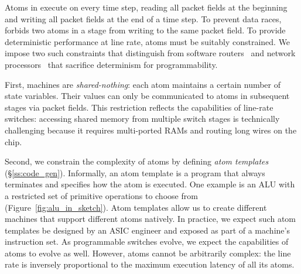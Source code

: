
Atoms in \absmachine execute on every time step, reading all packet fields at
the beginning and writing all packet fields at the end of a time step. To
prevent data races, \absmachine forbids two atoms in a stage from writing to
the same packet field.  To provide deterministic performance at line rate,
atoms must be suitably constrained.  We impose two such constraints that
distinguish \absmachine from software routers~\cite{click} and network
processors~\cite{ixp4xx} that sacrifice determinism for programmability.

First, \absmachine machines are \textit{shared-nothing}: each atom maintains a
certain number of state variables.  Their values can only be communicated to
atoms in subsequent stages via packet fields. This restriction reflects the
capabilities of line-rate switches: accessing shared memory from multiple
switch stages is technically challenging because it requires multi-ported RAMs
and routing long wires on the chip.

Second, we constrain the complexity of atoms by defining {\it atom templates}
(\S\ref{ss:code_gen}).  Informally, an atom template is a program that always
terminates and specifies how the atom is executed. One example is an ALU with a
restricted set of primitive operations to choose from
(Figure~\ref{fig:alu_in_sketch}). Atom templates allow us to create different
\absmachine machines that support different atoms natively. In practice, we
expect such atom templates be designed by an ASIC engineer and exposed as part
of a \absmachine machine's instruction set. As programmable switches evolve, we
expect the capabilities of atoms to evolve as well. However, atoms cannot be
arbitrarily complex: the line rate is inversely proportional to the maximum
execution latency of all its atoms.
